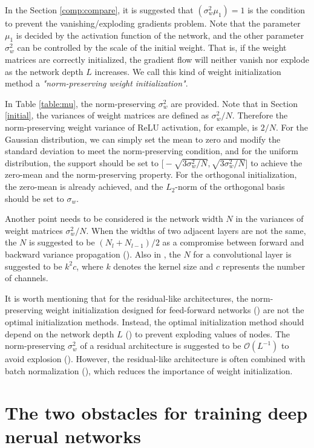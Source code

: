 In the Section \ref{comp:compare}, it is suggested that $(\sigma_w^2\mu_1)=1$ is the condition to
prevent the vanishing/exploding gradients problem. Note that the parameter $\mu_1$ is decided by the 
activation function of the network, and the other parameter $\sigma_w^2$ can be controlled by the
scale of the initial weight. That is, if the weight matrices are correctly initialized, the
gradient flow will neither vanish nor explode as the network depth $L$ increases. We call this kind
of weight initialization method a \textit{"norm-preserving weight initialization"}.

In Table \ref{table:mu}, the norm-preserving $\sigma_w^2$ are provided.
Note that in Section \ref{initial}, the variances of weight matrices are defined as $\sigma_w^2/N$.
Therefore the norm-preserving weight variance of ReLU activation, for example, is $2/N$.
For the Gaussian distribution, we can simply set the mean to zero and modify the standard deviation
to meet the norm-preserving condition, and for the uniform distribution, the support should be set to 
$\Big[-\sqrt{3\sigma_w^2/N}, \sqrt{3\sigma_w^2/N}\Big]$ to achieve the zero-mean and the
norm-preserving property.
For the orthogonal initialization, the zero-mean is already achieved, and the $L_2$-norm of the
orthogonal basis should be set to $\sigma_w$.

Another point needs to be considered is the network width $N$ in the variances of weight matrices
$\sigma_w^2/N$. When the widths of two adjacent layers are not the same, the $N$ is suggested to
be $(N_l+N_{l-1})/2$ as a compromise between forward and backward variance
propagation (\cite{xavier}). Also in \cite{he}, the $N$ for a convolutional layer is suggested to
be $k^2c$, where $k$ denotes the kernel size and $c$ represents the number of channels.

It is worth mentioning that for the residual-like architectures, the norm-preserving weight
initialization designed for feed-forward networks (\cite{xavier, he}) are not the optimal
initialization methods. Instead, the optimal initialization method should
depend on the network depth $L$ (\cite{mft:resnet}) to prevent exploding values of nodes.
The norm-preserving $\sigma_w^2$ of a residual architecture is suggested to be $\mathcal{O}(L^{-1})$
to avoid explosion (\cite{resnet_init}).
However, the residual-like architecture is often combined with batch normalization (\cite{batchnorm}),
which reduces the importance of weight initialization.

\section{The two obstacles for training deep nerual networks} \label{comp:obstacles}


